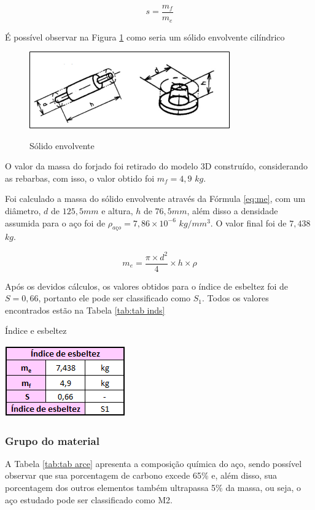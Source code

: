\documentclass[deposito, acronym, symbols]{fei}
\begin{document}
\begin{equation}
    \label{eq:s}
    s=\frac{m_f}{m_e}
\end{equation} 

É possível observar na Figura \ref{fig:indices} como seria um sólido envolvente cilíndrico 

\begin{figure}[!htp]
    \centering
    \caption{Sólido envolvente}
    \includegraphics[width=0.5\linewidth]{Imagens/indice de esbeltez.png}
    \label{fig:indices}
\end{figure}



O valor da massa do forjado foi retirado do modelo 3D construído, considerando as rebarbas, com isso, o valor obtido foi $m_f = 4,9 $ $kg$.

Foi calculado a massa do sólido envolvente através da Fórmula \ref{eq:me}, com um diâmetro, $d$ de $125,5mm$ e altura, $h$ de $76,5mm$, além disso a densidade assumida para o aço foi de $\rho_{aço} = 7,86\times{10^{-6}}$ $kg/mm^{3}$. O valor final foi de $7,438$ $kg$.


\begin{equation}
    \label{eq:me}
    m_e=\frac{\pi\times{d^{2}}}{4}\times{h}\times{\rho}
\end{equation} 

Após os devidos cálculos, os valores obtidos para o índice de esbeltez foi de $S = 0,66$, portanto ele pode ser classificado como $S_1$. Todos os valores encontrados estão na Tabela \ref{tab:tab inds}

 \begin{table}[!htb]
 \centering
    \caption{Índice e esbeltez}
    \includegraphics[width=0.3\linewidth]{Imagens/indice esbeltez.png}
    \label{tab:tab inds}
 \end{table}

\subsubsection{Grupo do material}
A Tabela \ref{tab:tab arce} apresenta a composição química do aço, sendo possível observar que sua porcentagem de carbono excede 65\% e, além disso, sua porcentagem dos outros elementos também ultrapassa 5\% da massa, ou seja, o aço estudado pode ser classificado como M2. 
\end{document}
